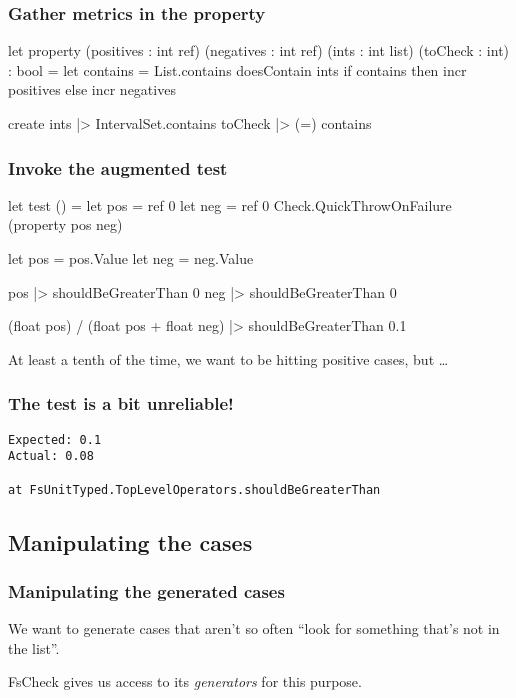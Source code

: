 \documentclass{beamer}
\begin{document}
\begin{frame}[fragile]
\frametitle{Gather metrics in the property}
\begin{fslisting}
let property
    (positives : int ref)
    (negatives : int ref)
    (ints : int list)
    (toCheck : int)
    : bool
    =
    let contains = List.contains doesContain ints
    if contains then
        incr positives
    else
        incr negatives

    create ints
    |> IntervalSet.contains toCheck
    |> (=) contains
\end{fslisting}
\end{frame}

\begin{frame}[fragile]
\frametitle{Invoke the augmented test}
\begin{fslisting}
[<Test>]
let test () =
    let pos = ref 0
    let neg = ref 0
    Check.QuickThrowOnFailure (property pos neg)

    let pos = pos.Value
    let neg = neg.Value

    pos |> shouldBeGreaterThan 0
    neg |> shouldBeGreaterThan 0

    (float pos) / (float pos + float neg)
    |> shouldBeGreaterThan 0.1
\end{fslisting}
\end{frame}

\begin{frame}
At least a tenth of the time, we want to be hitting positive cases, but \dots
\end{frame}

\begin{frame}[fragile]
\frametitle{The test is a bit unreliable!}
\begin{verbatim}
Expected: 0.1
Actual: 0.08

at FsUnitTyped.TopLevelOperators.shouldBeGreaterThan
\end{verbatim}
\end{frame}

\subsection{Manipulating the cases}
\begin{frame}
\frametitle{Manipulating the generated cases}
We want to generate cases that aren't so often ``look for something that's not in the list''.

FsCheck gives us access to its \emph{generators} for this purpose.
\end{frame}
\end{document}
